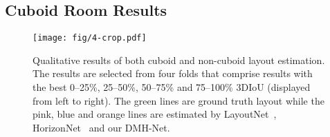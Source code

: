 \documentclass[runningheads]{llncs}
\begin{document}
\subsection{Cuboid Room Results}\label{sec:cuboid_result}

\begin{table}[t]
\centering
{}
\caption{Quantitative results of cuboid room layout estimation evaluated on the testset of the PanoContext dataset~\cite{zhang2014panocontext} and the Stanford 2D-3D dataset~\cite{armeni2017joint,zou2018layoutnet}. CE means Corner Error, and PE means Pixel Error.}
\label{tab:panocontext}
\end{table}

\begin{figure}[!b]
	\centering
	\texttt{[image: fig/4-crop.pdf]}
	\caption{Qualitative results of both cuboid and non-cuboid layout estimation. The results are selected from four folds that comprise results with the best 0–25\%, 25–50\%, 50–75\% and 75–100\% 3DIoU (displayed from left to right). The green lines are ground truth layout while the pink, blue and orange lines are estimated by LayoutNet~\cite{zou2018layoutnet}, HorizonNet~\cite{sun2019horizonnet} and our DMH-Net.
    }
\label{fig:visual_result} 
\end{figure}
\end{document}
